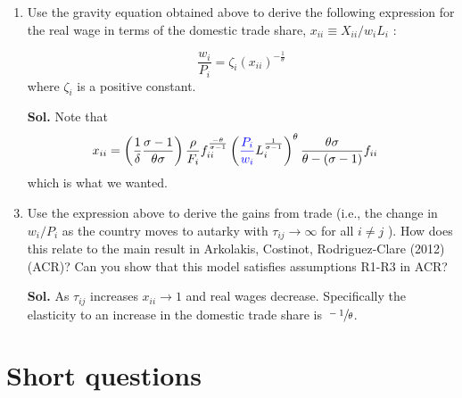 \documentclass[12pt,oneside,reqno]{amsart}
\begin{document}
\begin{enumerate}[label=\textbf{\roman*.}]
\begin{enumerate}[label=\textbf{(\alph*)}]
\end{enumerate}


\item  Use the gravity equation obtained above to derive the following expression for the real wage in terms of the domestic trade share, $x_{i i} \equiv X_{i i} / w_{i} L_{i}$ :

\begin{equation*}
\frac{w_{i}}{P_{i}}=\zeta_{i}\left(x_{i i}\right)^{-\frac{1}{\theta}}
\end{equation*}
where $\zeta_{i}$ is a positive constant.

\item[\textbf{Sol.}] Note that 
\begin{align*}
    x_{ii} &= \left(\frac{1}{\delta} \frac{\sigma-1}{\theta \sigma}\right) \frac{\rho}{F_{i}}f_{ii}^{\frac{-\theta}{\sigma-1}} \left(\textcolor{blue}{\frac{P_i}{w_i}} L_{i}^{\frac{1}{\sigma-1}}\right)^{\theta} \frac{\theta \sigma}{\theta-(\sigma-1)} f_{ii}  
\end{align*}
which is what we wanted. 
\item Use the expression above to derive the gains from trade (i.e., the change in $w_{i} / P_{i}$ as the country moves to autarky with $\tau_{i j} \rightarrow \infty$ for all $i \neq j$ ). How does this relate to the main result in Arkolakis, Costinot, Rodriguez-Clare (2012) (ACR)? Can you show that this model satisfies assumptions R1-R3 in ACR? 
\item[\textbf{Sol.}] As $\tau_{ij}$ increases $x_{ii}\to 1$ and real wages decrease. Specifically the elasticity to an increase in the domestic trade share is $\sfrac{-1}{\theta}$. 

\end{enumerate}


\clearpage
\section{Short questions}
\end{document}

